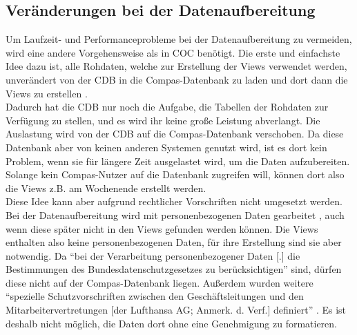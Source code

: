 \documentclass [12pt, a4paper, oneside, titlepage, ngerman]{article}
\begin{document}
\subsection{Veränderungen bei der Datenaufbereitung}
Um Laufzeit- und Performanceprobleme bei der Datenaufbereitung zu vermeiden, wird eine andere Vorgehensweise als in \ac{COC} benötigt. Die erste und einfachste Idee dazu ist, alle Rohdaten, welche zur Erstellung der Views verwendet werden, unverändert von der \ac{CDB} in die Compas-Datenbank zu laden und dort dann die Views zu erstellen \cite[vgl. dazu][]{Gespraech5}. \\
Dadurch hat die \ac{CDB} nur noch die Aufgabe, die Tabellen der Rohdaten zur Verfügung zu stellen, und es wird ihr keine große Leistung abverlangt. Die Auslastung wird von der \ac{CDB} auf die Compas-Datenbank verschoben. Da diese Datenbank aber von keinen anderen Systemen genutzt wird, ist es dort kein Problem, wenn sie für längere Zeit ausgelastet wird, um die Daten aufzubereiten. Solange kein Compas-Nutzer auf die Datenbank zugreifen will, können dort also die Views z.B. am Wochenende erstellt werden. \\
Diese Idee kann aber aufgrund rechtlicher Vorschriften nicht umgesetzt werden. Bei der Datenaufbereitung wird mit personenbezogenen Daten gearbeitet \cite[vgl.][S.6]{CMS}, auch wenn diese später nicht in den Views gefunden werden können. Die Views enthalten also keine personenbezogenen Daten, für ihre Erstellung sind sie aber notwendig. Da "`bei der Verarbeitung personenbezogener Daten [.] die Bestimmungen des Bundesdatenschutzgesetzes zu berücksichtigen"' \cite[S.6]{CMS} sind, dürfen diese nicht auf der Compas-Datenbank liegen. Außerdem wurden weitere "`spezielle Schutzvorschriften zwischen den Geschäftsleitungen und den Mitarbeitervertretungen [der Lufthansa AG; Anmerk. d. Verf.] definiert"' \cite[S.6]{CMS}. Es ist deshalb nicht möglich, die Daten dort ohne eine Genehmigung zu formatieren.
\end{document}
